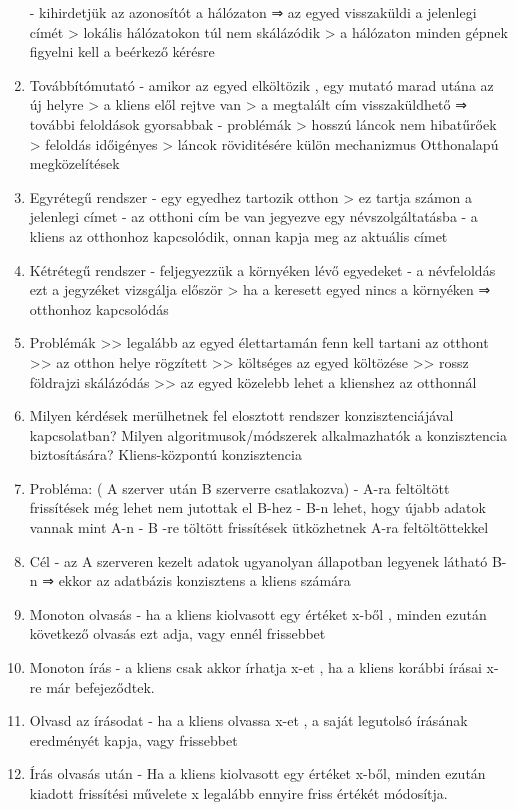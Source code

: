 \documentclass[twoside, a4paper, 12pt]{article}
\begin{document}
\begin{enumerate}
                - kihirdetjük az azonosítót a hálózaton ⇒ az egyed visszaküldi a jelenlegi címét
                > lokális hálózatokon túl nem skálázódik
                > a hálózaton minden gépnek figyelni kell a beérkező kérésre 
            \item Továbbítómutató
                - amikor az egyed elköltözik , egy mutató marad utána az új helyre
                > a kliens elől rejtve van
                > a megtalált cím visszaküldhető ⇒ további feloldások gyorsabbak
                - problémák
                > hosszú láncok nem hibatűrőek
                > feloldás időigényes
                > láncok röviditésére külön mechanizmus
                Otthonalapú megközelítések
            \item Egyrétegű rendszer
                - egy egyedhez tartozik otthon
                > ez tartja számon a jelenlegi címet
                - az otthoni cím be van jegyezve egy névszolgáltatásba
                - a kliens az otthonhoz kapcsolódik, onnan kapja meg az aktuális címet
            \item Kétrétegű rendszer
                - feljegyezzük a környéken lévő egyedeket
                - a névfeloldás ezt a jegyzéket vizsgálja először
                > ha a keresett egyed nincs a környéken ⇒ otthonhoz kapcsolódás
            \item Problémák
                >> legalább az egyed élettartamán fenn kell tartani az otthont
                >> az otthon helye rögzített >> költséges az egyed költözése
                >> rossz földrajzi skálázódás
                >> az egyed közelebb lehet a klienshez az otthonnál
            \item  Milyen kérdések merülhetnek fel elosztott rendszer konzisztenciájával kapcsolatban? Milyen algoritmusok/módszerek alkalmazhatók a konzisztencia biztosítására? 
                Kliens-központú konzisztencia
            \item Probléma: ( A szerver után B szerverre csatlakozva)
                - A-ra feltöltött frissítések még lehet nem jutottak el B-hez
                - B-n lehet, hogy újabb adatok vannak mint A-n
                - B -re töltött frissítések ütközhetnek A-ra feltöltöttekkel
            \item Cél
                - az A szerveren kezelt adatok ugyanolyan állapotban legyenek látható B-n ⇒ ekkor az adatbázis konzisztens a kliens számára
            \item Monoton olvasás
                - ha a kliens kiolvasott egy értéket x-ből , minden ezután következő olvasás ezt adja, vagy ennél frissebbet
            \item Monoton írás
                - a kliens csak akkor írhatja x-et , ha a kliens korábbi írásai x-re már befejeződtek.
            \item Olvasd az írásodat
                - ha a kliens olvassa x-et , a saját legutolsó írásának eredményét kapja, vagy frissebbet
            \item Írás olvasás után
                - Ha a kliens kiolvasott egy értéket x-ből, minden ezután kiadott frissítési művelete x legalább ennyire friss értékét módosítja.
        \end{enumerate}
        
\end{document}
